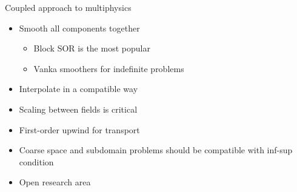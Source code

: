 \begin{frame}{Coupled approach to multiphysics}
  \begin{itemize}
  \item Smooth all components together
    \begin{itemize}
    \item Block SOR is the most popular
    \item Vanka smoothers for indefinite problems
    \end{itemize}
  \item Interpolate in a compatible way
  \item Scaling between fields is critical
  \item First-order upwind for transport
  \item Coarse space and subdomain problems should be compatible with inf-sup condition
  \item Open research area
  \end{itemize}
\end{frame}
